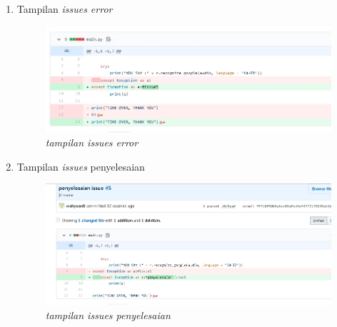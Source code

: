 \begin{enumerate}
\newpage

\item Tampilan \textit{issues error}
\begin{figure}[!htbp]
    \centering
    \includegraphics[width=12cm]{figures/tampilanissueserror}
    \caption{\textit{tampilan issues error}}
\end{figure}

\item Tampilan \textit{issues} penyelesaian
\begin{figure}[!htbp]
    \centering
    \includegraphics[width=12cm]{figures/tampilanissuespenyelesaian}
    \caption{\textit{tampilan issues penyelesaian}}
\end{figure}

\end{enumerate}

